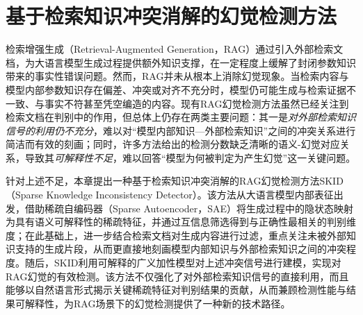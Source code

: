 \chapter{基于检索知识冲突消解的幻觉检测方法}\label{chp:chapter4}



检索增强生成（Retrieval-Augmented Generation，RAG）通过引入外部检索文档，为大语言模型生成过程提供额外知识支撑，在一定程度上缓解了封闭参数知识带来的事实性错误问题。然而，RAG并未从根本上消除幻觉现象。当检索内容与模型内部参数知识存在偏差、冲突或对齐不充分时，模型仍可能生成与检索证据不一致、与事实不符甚至凭空编造的内容。现有RAG幻觉检测方法虽然已经关注到检索文档在判别中的作用，但总体上仍存在两类主要问题：其一是\emph{对外部检索知识信号的利用仍不充分}，难以对“模型内部知识—外部检索知识”之间的冲突关系进行简洁而有效的刻画；同时，许多方法给出的检测分数缺乏清晰的语义-幻觉对应关系，导致其\emph{可解释性不足}，难以回答“模型为何被判定为产生幻觉”这一关键问题。

针对上述不足，本章提出一种基于检索知识冲突消解的RAG幻觉检测方法SKID（Sparse Knowledge Inconsistency Detector）。该方法从大语言模型内部表征出发，借助稀疏自编码器（Sparse Autoencoder，SAE）将生成过程中的隐状态映射为具有语义可解释性的稀疏特征，并通过互信息筛选得到与正确性最相关的判别维度；在此基础上，进一步结合检索文档对生成内容进行过滤，重点关注未被外部知识支持的生成片段，从而更直接地刻画模型内部知识与外部检索知识之间的冲突程度。随后，SKID利用可解释的广义加性模型对上述冲突信号进行建模，实现对RAG幻觉的有效检测。该方法不仅强化了对外部检索知识信号的直接利用，而且能够以自然语言形式揭示关键稀疏特征对判别结果的贡献，从而兼顾检测性能与结果可解释性，为RAG场景下的幻觉检测提供了一种新的技术路径。

